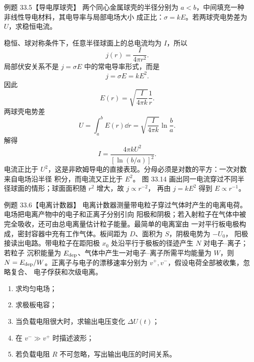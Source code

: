\Needspace{0.38\textheight}
\begin{origexamplebox}{例题 33.5【导电厚球壳】}
两个同心金属球壳的半径分别为 $a<b$，中间填充一种非线性导电材料，其电导率与局部电场大小
成正比：$\sigma=kE$。若两球壳电势差为 $U$，求稳恒电流。
\end{origexamplebox}

\begin{xesolution}
稳恒、球对称条件下，任意半径球面上的总电流均为 $I$，所以
\begin{equation}
  j(r)=\frac{I}{4\pi r^2}.
\end{equation}
局部伏安关系不是 $j=\sigma E$ 中的常电导率形式，而是
\[
  j=\sigma E=kE^2.
\]
因此
\begin{equation}
  E(r)=\sqrt{\frac{I}{4\pi k}}\frac1r.
\end{equation}
两球壳电势差
\[
  U=\int_a^bE(r)\dd r
  =\sqrt{\frac{I}{4\pi k}}\ln\frac ba.
\]
解得
\begin{equation}
  \boxed{I=\frac{4\pi kU^2}{[\ln(b/a)]^2}}.
\end{equation}
电流正比于 $U^2$，这是非欧姆导电的直接表现。分母必须是对数的平方：一次对数来自电场沿半径
积分，而电流又正比于 $E^2$。
图 33.14 画出同一电流穿过不同半径球面的情形；球面面积随 $r^2$ 增大，故 $j\propto r^{-2}$，
再由 $j=kE^2$ 得到 $E\propto r^{-1}$。

\nonlinearShellDiagram
\end{xesolution}

\Needspace{0.48\textheight}
\begin{origexamplebox}{例题 33.6【电离计数器】}
电离计数器测量带电粒子穿过气体时产生的电离电荷。电场把电离产物中的电子和正离子分别引向
阳极和阴极；若入射粒子在气体中被完全吸收，还可由总电离量估计粒子能量。最简单的电离室由
一对平行板电极构成，密封容器中充有工作气体。板间距为 $D$、面积为 $S$，阴极电势为 $-U_0$，
阳极接读出电路。带电粒子在距阳极 $x_0$ 处沿平行于极板的径迹产生 $N$ 对电子--离子；若粒子
沉积能量为 $E_{\rm dep}$、气体中产生一对电子--离子所需平均能量为 $W$，则
$N=E_{\rm dep}/W$。正离子与电子的漂移速率分别为 $v^+,v^-$，假设电荷全部被收集，忽略复合、
电子俘获和次级电离。
\begin{enumerate}[label=(\arabic*),leftmargin=2.2em]
  \item 求均匀电场；
  \item 求极板电容；
  \item 当负载电阻很大时，求输出电压变化 $\Delta U(t)$；
  \item 在 $v^-\gg v^+$ 时描述波形；
  \item 若负载电阻 $R$ 不可忽略，写出输出电压的时间关系。
\end{enumerate}
\end{origexamplebox}

